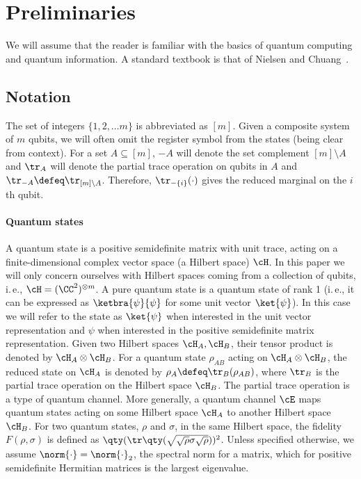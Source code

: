 \documentclass[11pt]{article}
\newcommand{\ie}{i.\,e.}
\begin{document}
\section{Preliminaries}
\label{sec:preliminaries}

We will assume that the reader is familiar with the basics of quantum computing and quantum information. %
A standard textbook is that of Nielsen and Chuang~\cite{Nielsen_Chuang_2010}.
%

\subsection{Notation}
\label{subsec:notation}

The set of integers $\{1,2,\ldots m\}$ is abbreviated as $[m]$. Given a composite system of $m$ qubits, we will often omit the register symbol from the states (being clear from context). For a set $A\subseteq [m]$, $-A$ will denote the set complement $[m] \setminus A$ and $\tr_A$ will denote the partial trace operation on qubits in $A$ and $\tr_{-A}\defeq\tr_{[m]\setminus A}$. Therefore, $\tr_{-\{i\}}(\cdot)$ gives the reduced marginal on the $i$th qubit.

\paragraph{Quantum states} A quantum state is a positive semidefinite matrix with unit trace, acting on a finite-dimensional complex vector space (a Hilbert space) $\cH$. In this paper we will only concern ourselves with Hilbert spaces coming from a collection of qubits, \ie, $\cH = (\CC^2)^{\otimes m}$. A pure quantum state is a quantum state
%
of   %
rank 1 (\ie, it can be expressed as $\ketbra{\psi}{\psi}$ for some unit vector $\ket{\psi}$). In
%
this  %
case we will refer to the state as $\ket{\psi}$ when interested in the unit vector representation and $\psi$ when interested in the positive semidefinite matrix representation. Given two Hilbert spaces $\cH_A,\cH_B$, their tensor product is denoted by $\cH_A\otimes \cH_B$. For a quantum state $\rho_{AB}$ acting on $\cH_A\otimes \cH_B$, the reduced state on $\cH_A$ is denoted by $\rho_A\defeq \tr_{B}(\rho_{AB})$, where $\tr_B$ is the partial trace operation on the Hilbert space $\cH_B$. The partial trace operation is a type of quantum channel. More generally, a quantum channel $\cE$ maps quantum states acting on some Hilbert space $\cH_A$ to another Hilbert space $\cH_B$. For two quantum states,
$\rho$ and $\sigma$,  %
in the same Hilbert space, the fidelity $F(\rho, \sigma)$ is defined as $\qty(\tr\qty(\sqrt{\sqrt{\rho} \sigma \sqrt{\rho}}))^2$. Unless
%
specified otherwise,  %
we assume $\norm{\cdot} = \norm{\cdot}_2$, the spectral norm for a matrix, which for
positive semidefinite  %
%
Hermitian matrices is the largest eigenvalue. 
\end{document}
